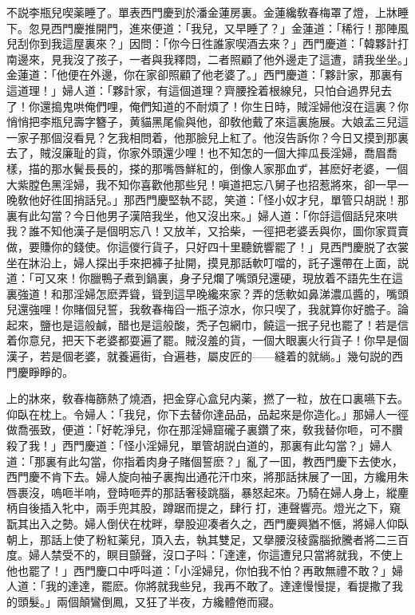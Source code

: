 不説李瓶兒喫薬睡了。單表西門慶到於潘金蓮房裏。金蓮纔敎春梅罩了燈，上牀睡下。忽見西門慶推開門，進來便道：「我兒，又早睡了？」金蓮道：「稀行！那陣風兒刮你到我這屋裏來？」因問：「你今日徃誰家喫酒去來？」西門慶道：「韓夥計打南邊來，見我沒了孩子，一者與我釋悶，二者照顧了他外邊走了這遭，請我坐坐。」金蓮道：「他便在外邊，你在家卻照顧了他老婆了。」西門慶道：「夥計家，那裏有這道理！」婦人道：「夥計家，有這個道理？齊腰拴着根線兒，只怕㒲過界兒去了！你還搗鬼哄俺們哩，俺們知道的不耐煩了！你生日時，賊淫婦他沒在這裏？你悄悄把李瓶兒壽字簪子，黄貓黑尾偸與他，卻敎他戴了來這裏施展。大娘孟三兒這一家子那個沒看見？乞我相問着，他那臉兒上紅了。他沒告訴你？今日又摸到那裏去了，賊沒廉耻的貨，你家外頭還少哩！也不知怎的一個大摔瓜長淫婦，喬眉喬樣，描的那水鬢長長的，搽的那嘴唇鮮紅的，倒像人家那血ず，甚麽好老婆，一個大紫膛色黑淫婦，我不知你喜歡他那些兒！嗔道把忘八舅子也招惹將來，卻一早一晚敎他好徃囬捎話兒。」那西門慶堅執不認，笑道：「怪小奴才兒，單管只胡説！那裏有此勾當？今日他男子漢陪我坐，他又沒出來。」婦人道：「你㧱這個話兒來哄我？誰不知他漢子是個明忘八！又放羊，又拾柴，一徑把老婆丢與你，圖你家買賣做，要賺你的錢使。你這儍行貨子，只好四十里聽銃響罷了！」見西門慶脱了衣裳坐在牀沿上，婦人探出手來把褲子扯開，摸見那話軟叮噹的，託子還帶在上面，説道：「可又來！你臘鴨子煮到鍋裏，身子兒爛了嘴頭兒還硬，現放着不語先生在這裏強道！和那淫婦怎麽弄聳，聳到這早晚纔來家？弄的恁軟如鼻涕濃瓜醬的，嘴頭兒還強哩！你賭個兒誓，我敎春梅舀一瓶子涼水，你只喫了，我就算你好膽子。論起來，鹽也是這般鹹，醋也是這般酸，秃子包網巾，饒這一抿子兒也罷了！若是信着你意兒，把天下老婆都耍遍了罷。賊沒羞的貨，一個大眼裏火行貨子！你早是個漢子，若是個老婆，就養遍街，㒲遍巷，屬皮匠的——縫着的就緔。」幾句説的西門慶睜睜的。

上的牀來，敎春梅篩熱了燒酒，把金穿心盒兒内薬，撚了一粒，放在口裏嚥下去。仰臥在枕上。令婦人：「我兒，你下去替你達品品，品起來是你造化。」那婦人一徑做喬張致，便道：「好乾淨兒，你在那淫婦窟礲子裏鑽了來，敎我替你咂，可不臢殺了我！」西門慶道：「怪小淫婦兒，單管胡説白道的，那裏有此勾當？」婦人道：「那裏有此勾當，你指着肉身子賭個誓麽？」亂了一囬，教西門慶下去使水，西門慶不肯下去。婦人旋向袖子裏掏出通花汗巾來，將那話抹展了一囬，方纔用朱唇裹沒，嗚咂半响，登時咂弄的那話奢稜跳腦，暴怒起來。乃騎在婦人身上，縱麈柄自後插入牝中，兩手兜其股，蹲踞而提之，肆行𢵞打，連聲響亮。燈光之下，窺翫其出入之勢。婦人倒伏在枕畔，擧股迎凑者久之，西門慶興猶不愜，將婦人仰臥朝上，那話上使了粉紅薬兒，頂入去，執其雙足，又擧腰沒稜露腦掀騰者將二三百度。婦人禁受不的，瞑目顫聲，沒口子呌：「達達，你這遭兒只當將就我，不使上他也罷了！」西門慶口中呼呌道：「小淫婦兒，你怕我不怕？再敢無禮不敢？」婦人道：「我的達達，罷麽。你將就我些兒，我再不敢了。達達慢慢提，看提撒了我的頭髮。」兩個顛鸞倒鳳，又狂了半夜，方纔體倦而寢。

